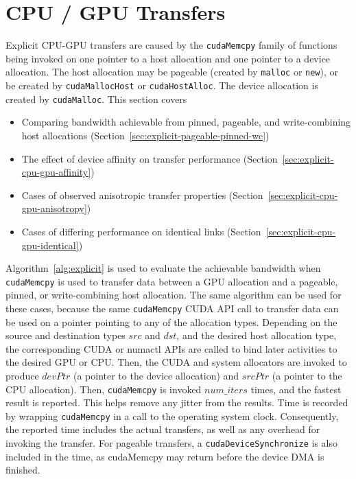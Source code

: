 \section{CPU / GPU Transfers}
\label{sec:explicit-cpu-gpu}

Explicit CPU-GPU transfers are caused by the \texttt{cudaMemcpy} family of functions being invoked on one pointer to a host allocation and one pointer to a device allocation.
The host allocation may be pageable (created by \texttt{malloc} or \texttt{new}), or be created by \texttt{cudaMallocHost} or \texttt{cudaHostAlloc}.
The device allocation is created by \texttt{cudaMalloc}.
This section covers
\begin{itemize}
	\item Comparing bandwidth achievable from pinned, pageable, and write-combining host allocations (Section~\ref{sec:explicit-pageable-pinned-wc})
	\item The effect of device affinity on transfer performance (Section~\ref{sec:explicit-cpu-gpu-affinity})
	\item Cases of observed anisotropic transfer properties (Section~\ref{sec:explicit-cpu-gpu-anisotropy})
	\item Cases of differing performance on identical links (Section~\ref{sec:explicit-cpu-gpu-identical})
\end{itemize}

Algorithm~\ref{alg:explicit} is used to evaluate the achievable bandwidth when \texttt{cudaMemcpy} is used to transfer data between a GPU allocation and a pageable, pinned, or write-combining host allocation. 
The same algorithm can be used for these cases, because the same \texttt{cudaMemcpy} CUDA API call to transfer data can be used on a pointer pointing to any of the allocation types.
Depending on the source and destination types $src$ and $dst$, and the desired host allocation type, the corresponding CUDA or numactl APIs are called to bind later activities to the desired GPU or CPU.
Then, the CUDA and system allocators are invoked to produce $devPtr$ (a pointer to the device allocation) and $srcPtr$ (a pointer to the CPU allocation).
Then, \texttt{cudaMemcpy} is invoked $num\_iters$ times, and the fastest result is reported.
This helps remove any jitter from the results.
Time is recorded by wrapping \texttt{cudaMemcpy} in a call to the operating system clock.
Consequently, the reported time includes the actual transfers, as well as any overhead for invoking the transfer.
For pageable transfers, a \texttt{cudaDeviceSynchronize} is also included in the time, as cudaMemcpy may return before the device DMA is finished.


